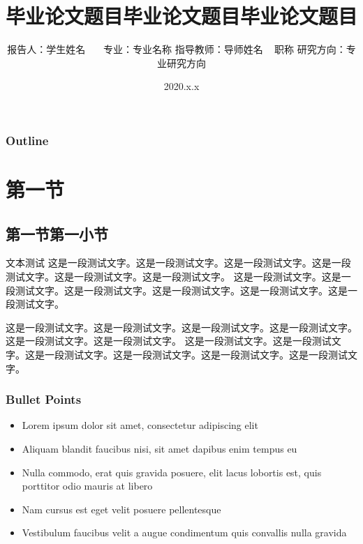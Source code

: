 \documentclass[11pt]{beamer}
\title[论文题目]{毕业论文题目毕业论文题目毕业论文题目}
\author[学生姓名]
{
  报告人：学生姓名~~~ \vskip 3mm
  专业：专业名称 \vskip 3mm
  指导教师：导师姓名 ~ 职称 \vskip 3mm
  研究方向：专业研究方向
}
\institute[学校名称]{}
\date[2020.x.x]{2020.x.x}
\numberwithin{thm}{section}
\numberwithin{defn}{section}
\numberwithin{lmm}{section}
\theoremstyle{example}
\numberwithin{figure}{section}
\numberwithin{table}{section}
\numberwithin{equation}{section}
\begin{document}
\kaishu

\begin{frame}
\titlepage
\end{frame}

\begin{frame}
\frametitle{Outline}
\tableofcontents
\end{frame}


\section{第一节}

\subsection{第一节第一小节}

\begin{frame}{文本测试}
这是一段测试文字。这是一段测试文字。这是一段测试文字。这是一段测试文字。这是一段测试文字。这是一段测试文字。
这是一段测试文字。这是一段测试文字。这是一段测试文字。这是一段测试文字。这是一段测试文字。这是一段测试文字。

\vspace{1ex}
这是一段测试文字。这是一段测试文字。这是一段测试文字。这是一段测试文字。这是一段测试文字。这是一段测试文字。
这是一段测试文字。这是一段测试文字。这是一段测试文字。这是一段测试文字。这是一段测试文字。这是一段测试文字。

\end{frame}


\begin{frame}
\frametitle{Bullet Points}
\begin{itemize}[<+-| alert@+>]
\item Lorem ipsum dolor sit amet, consectetur adipiscing elit
\item Aliquam blandit faucibus nisi, sit amet dapibus enim tempus eu
\item Nulla commodo, erat quis gravida posuere, elit lacus lobortis est, quis porttitor odio mauris at libero
\item Nam cursus est eget velit posuere pellentesque
\item Vestibulum faucibus velit a augue condimentum quis convallis nulla gravida
\end{itemize}
\end{frame}
\end{document}
